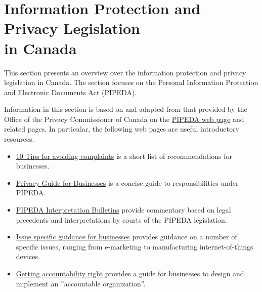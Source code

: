 \section{Information Protection and Privacy Legislation\\ in Canada}
\label{sec:privacy}

This section presents an overview over the information protection and privacy legislation in Canada. The section focuses on the Personal Information Protection and Electronic Documents Act (PIPEDA).

\begin{resourcebox}

Information in this section is based on and adapted from that provided by the Office of the Privacy Commissioner of Canada on the \href{https://www.priv.gc.ca/en/privacy-topics/privacy-laws-in-canada/the-personal-information-protection-and-electronic-documents-act-pipeda/p_principle/}{PIPEDA web page} and related pages. In particular, the following web pages are useful introductory resources:
\begin{itemize}
   \item \href{https://www.priv.gc.ca/en/privacy-topics/privacy-laws-in-canada/the-personal-information-protection-and-electronic-documents-act-pipeda/pipeda-compliance-help/02_05_d_55_tips/}{10 Tips for avoiding complaints} is a short list of recommendations for businesses. 
   \item \href{https://www.priv.gc.ca/media/2038/guide_org_e.pdf}{Privacy Guide for Businesses} is a concise guide to responsibilities under PIPEDA.
   \item \href{https://www.priv.gc.ca/en/privacy-topics/privacy-laws-in-canada/the-personal-information-protection-and-electronic-documents-act-pipeda/pipeda-compliance-help/pipeda-interpretation-bulletins/}{PIPEDA Interpretation Bulletins} provide commentary based on legal precedents and interpretations by courts of the PIPEDA legislation.
   \item \href{https://www.priv.gc.ca/en/privacy-topics/privacy-laws-in-canada/the-personal-information-protection-and-electronic-documents-act-pipeda/pipeda-compliance-help/issue-specific-guidance-for-businesses/}{Issue specific guidance for businesses} provides guidance on a number of specific issues, ranging from e-marketing to manufacturing internet-of-things devices.
   \item \href{https://www.priv.gc.ca/en/privacy-topics/privacy-laws-in-canada/the-personal-information-protection-and-electronic-documents-act-pipeda/pipeda-compliance-help/pipeda-compliance-and-training-tools/gl_acc_201204/}{Getting accountability right} provides a guide for businesses to design and implement an ''accountable organization''. 
\end{itemize}
\end{resourcebox}

